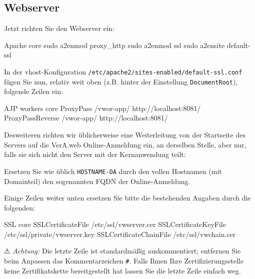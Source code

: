\documentclass{tarentanleitung}
\begin{document}
\subsection{Webserver}\label{subsec:setup-oa-apache}

\begin{minipage}{\linewidth}
Jetzt richten Sie den Webserver ein:

\begin{lstdump}{Apache core}
sudo a2enmod proxy_http
sudo a2enmod ssl
sudo a2ensite default-ssl
\end{lstdump}
\end{minipage}

\begin{minipage}{\linewidth}
In der vhost-Konfiguration \texttt{/etc/apache2/sites-enabled/default-ssl.conf}
fügen Sie nun, relativ weit oben (z.B. hinter der Einstellung
\texttt{DocumentRoot}), folgende Zeilen ein:

\begin{lstdump}{AJP workers core}
ProxyPass /vwor-app/ http://localhost:8081/
ProxyPassReverse /vwor-app/ http://localhost:8081/
\end{lstdump}
\end{minipage}

\begin{minipage}{\linewidth}
Desweiteren richten wir üblicherweise eine Weiterleitung von der
Startseite des Servers auf die VerA.web Online-Anmeldung ein, an
derselben Stelle, aber nur, falls sie sich nicht den Server mit
der Kernanwendung teilt:

\end{minipage}

Ersetzen Sie wie üblich \texttt{HOSTNAME-OA} durch den vollen
Hostnamen (mit Domainteil) \dash den sogenannten FQDN \dash der
Online-Anmeldung.

\begin{minipage}{\linewidth}
Einige Zeilen weiter unten ersetzen Sie bitte die bestehenden
Angaben durch die folgenden:

\begin{lstdump}{SSL core}
SSLCertificateFile /etc/ssl/vwserver.cer
SSLCertificateKeyFile /etc/ssl/private/vwserver.key
SSLCertificateChainFile /etc/ssl/vwchain.cer
\end{lstdump}

⚠ \emph{Achtung:} Die letzte Zeile ist standardmäßig auskommentiert;
entfernen Sie beim Anpassen das Kommentarzeichen \texttt{\#}. Falls
Ihnen Ihre Zertifizierungsstelle keine Zertifikatskette bereitgestellt
hat lassen Sie die letzte Zeile einfach weg.
\end{minipage}
\end{document}
